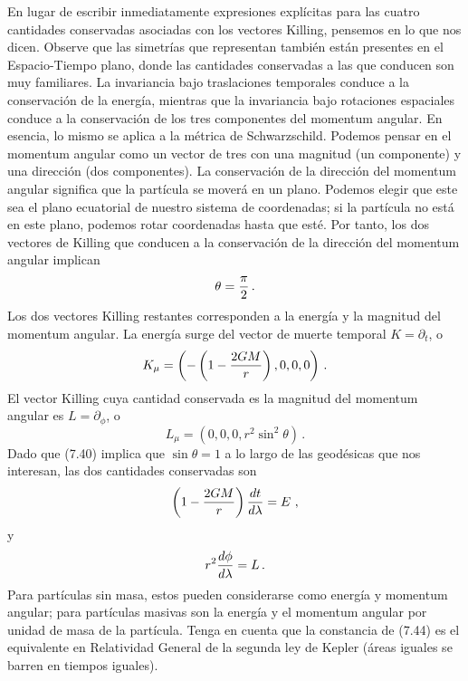 \documentclass[11pt,b5paper,openany,twoside]{book}
\newcommand{\p}[1]{{\partial_{#1}}}
\begin{document}
En lugar de escribir inmediatamente expresiones explícitas para las cuatro cantidades conservadas asociadas con los vectores Killing, pensemos en lo que nos dicen.
Observe que las simetrías que representan también están presentes en el Espacio-Tiempo plano, donde las cantidades conservadas a las que conducen son muy familiares.
La invariancia bajo traslaciones temporales conduce a la conservación de la energía, mientras que la invariancia bajo rotaciones espaciales conduce a la conservación de los tres componentes del momentum angular.
En esencia, lo mismo se aplica a la métrica de Schwarzschild.
Podemos pensar en el momentum angular como un vector de tres con una magnitud (un componente) y una dirección (dos componentes).
La conservación de la dirección del momentum angular significa que la partícula se moverá en un plano.
Podemos elegir que este sea el plano ecuatorial de nuestro sistema de coordenadas; si la partícula no está en este plano, podemos rotar coordenadas hasta que esté.
Por tanto, los dos vectores de Killing que conducen a la conservación de la dirección del momentum angular implican
\begin{equation}
\theta = {\pi\over 2}\,.\label{7.40}
\end{equation}
Los dos vectores Killing restantes corresponden a la energía y la magnitud del momentum angular.
La energía surge del vector de muerte temporal $K = \partial_t$, o
\begin{equation}
K_\mu = \left(-\left(1-{{2GM}\over r}\right),0,0,0\right)
\,.\label{7.41}
\end{equation}
El vector Killing cuya cantidad conservada es la magnitud del momentum angular es $L = \p\phi$, o
\begin{equation}
L_\mu = \left(0,0,0,r^2\sin^2\theta \right)\,.\label{7.42}
\end{equation}
Dado que (7.40) implica que $\sin\theta = 1$ a lo largo de las geodésicas que nos interesan, las dos cantidades conservadas son
\begin{equation}
\left(1-{{2GM}\over r}\right){{dt}\over{d\lambda}}=E\ ,\label{7.43}
\end{equation}
y
\begin{equation}
r^2{{d\phi}\over{d\lambda}}=L\,.\label{7.44}
\end{equation}
Para partículas sin masa, estos pueden considerarse como energía y momentum angular; para partículas masivas son la energía y el momentum angular por unidad de masa de la partícula.
Tenga en cuenta que la constancia de (7.44) es el equivalente en Relatividad General de la segunda ley de Kepler (áreas iguales se barren en tiempos iguales).
\end{document}
